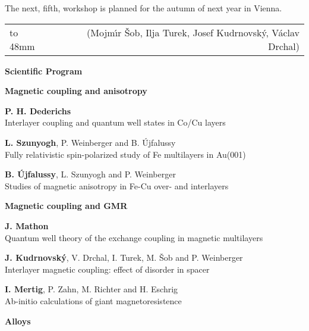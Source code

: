 {The next, fifth, workshop is planned for the autumn of next year in Vienna.\\

\begin{tabular}{lr}
                     \hbox to 48mm{}  & (Mojm\'{\i}r \v Sob, Ilja Turek,
                           Josef Kudrnovsk\'y, V\'aclav Drchal) \\

\end{tabular}

{\Large{\bf Scientific Program}}

\bigskip

{\Large{\bf Magnetic coupling and anisotropy}}

\vskip1mm

{\bf P. H. Dederichs} \\
              Interlayer coupling and quantum well states in Co/Cu
             layers

 {\bf L. Szunyogh}, P. Weinberger and B. \'Ujfalussy \\
               Fully relativistic spin-polarized study of Fe
                multilayers in Au(001)

{\bf B. \'Ujfalussy}, L. Szunyogh and P. Weinberger \\
                Studies of magnetic anisotropy in Fe-Cu over- and
                 interlayers


{\Large{\bf Magnetic coupling and GMR}}

\vskip1mm

 {\bf J. Mathon}\\
                     Quantum well theory of the exchange coupling in
                      magnetic
                     multilayers

 {\bf J. Kudrnovsk\'y}, V. Drchal, I. Turek,
                      M. \v Sob and P. Weinberger \\
                     Interlayer magnetic coupling: effect of disorder
                      in spacer

 {\bf I. Mertig}, P. Zahn, M. Richter and H.
Eschrig\\
                     Ab-initio calculations of giant magnetoresistence


\vskip4mm
{\Large{\bf Alloys }}

}
